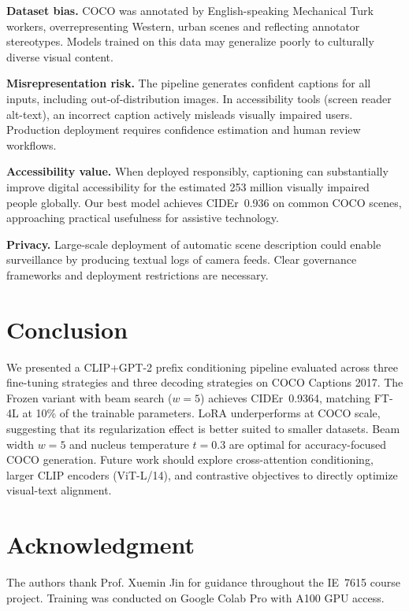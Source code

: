 \documentclass[conference]{IEEEtran}
\begin{document}
\textbf{Dataset bias.} COCO was annotated by English-speaking Mechanical Turk workers, overrepresenting Western, urban scenes and reflecting annotator stereotypes. Models trained on this data may generalize poorly to culturally diverse visual content.

\textbf{Misrepresentation risk.} The pipeline generates confident captions for all inputs, including out-of-distribution images. In accessibility tools (screen reader alt-text), an incorrect caption actively misleads visually impaired users. Production deployment requires confidence estimation and human review workflows.

\textbf{Accessibility value.} When deployed responsibly, captioning can substantially improve digital accessibility for the estimated 253 million visually impaired people globally. Our best model achieves CIDEr~0.936 on common COCO scenes, approaching practical usefulness for assistive technology.

\textbf{Privacy.} Large-scale deployment of automatic scene description could enable surveillance by producing textual logs of camera feeds. Clear governance frameworks and deployment restrictions are necessary.

\section{Conclusion}

We presented a CLIP+GPT-2 prefix conditioning pipeline evaluated across three fine-tuning strategies and three decoding strategies on COCO Captions 2017. The Frozen variant with beam search ($w=5$) achieves CIDEr~0.9364, matching FT-4L at 10\% of the trainable parameters. LoRA underperforms at COCO scale, suggesting that its regularization effect is better suited to smaller datasets. Beam width $w=5$ and nucleus temperature $t=0.3$ are optimal for accuracy-focused COCO generation. Future work should explore cross-attention conditioning, larger CLIP encoders (ViT-L/14), and contrastive objectives to directly optimize visual-text alignment.

\section*{Acknowledgment}

The authors thank Prof. Xuemin Jin for guidance throughout the IE~7615 course project. Training was conducted on Google Colab Pro with A100 GPU access.
\end{document}
